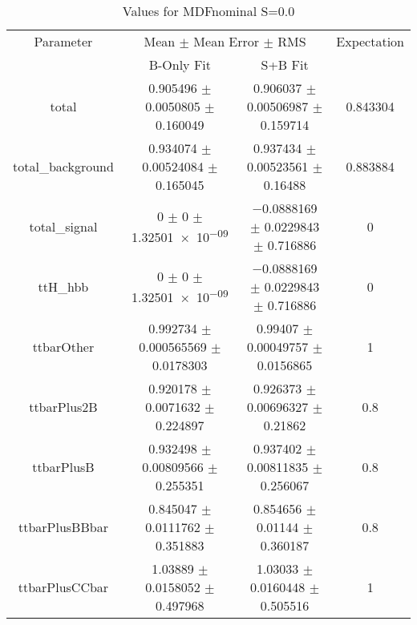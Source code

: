 \begin{table}
\centering
\caption{Values for MDFnominal S=0.0}
\begin{tabular}{cccc}
\toprule
Parameter & \multicolumn{2}{c}{Mean $\pm$ Mean Error $\pm$ RMS} & Expectation\\
 & B-Only Fit & S+B Fit & \\
\midrule
total & \num{0.905496} $\pm$ \num{0.0050805} $\pm$ \num{0.160049} & \num{0.906037} $\pm$ \num{0.00506987} $\pm$ \num{0.159714} & \num{0.843304}\\
total\_background & \num{0.934074} $\pm$ \num{0.00524084} $\pm$ \num{0.165045} & \num{0.937434} $\pm$ \num{0.00523561} $\pm$ \num{0.16488} & \num{0.883884}\\
total\_signal & \num{0} $\pm$ \num{0} $\pm$ \num{1.32501e-09} & \num{-0.0888169} $\pm$ \num{0.0229843} $\pm$ \num{0.716886} & \num{0}\\
ttH\_hbb & \num{0} $\pm$ \num{0} $\pm$ \num{1.32501e-09} & \num{-0.0888169} $\pm$ \num{0.0229843} $\pm$ \num{0.716886} & \num{0}\\
ttbarOther & \num{0.992734} $\pm$ \num{0.000565569} $\pm$ \num{0.0178303} & \num{0.99407} $\pm$ \num{0.00049757} $\pm$ \num{0.0156865} & \num{1}\\
ttbarPlus2B & \num{0.920178} $\pm$ \num{0.0071632} $\pm$ \num{0.224897} & \num{0.926373} $\pm$ \num{0.00696327} $\pm$ \num{0.21862} & \num{0.8}\\
ttbarPlusB & \num{0.932498} $\pm$ \num{0.00809566} $\pm$ \num{0.255351} & \num{0.937402} $\pm$ \num{0.00811835} $\pm$ \num{0.256067} & \num{0.8}\\
ttbarPlusBBbar & \num{0.845047} $\pm$ \num{0.0111762} $\pm$ \num{0.351883} & \num{0.854656} $\pm$ \num{0.01144} $\pm$ \num{0.360187} & \num{0.8}\\
ttbarPlusCCbar & \num{1.03889} $\pm$ \num{0.0158052} $\pm$ \num{0.497968} & \num{1.03033} $\pm$ \num{0.0160448} $\pm$ \num{0.505516} & \num{1}\\
\bottomrule
\end{tabular}
\end{table}